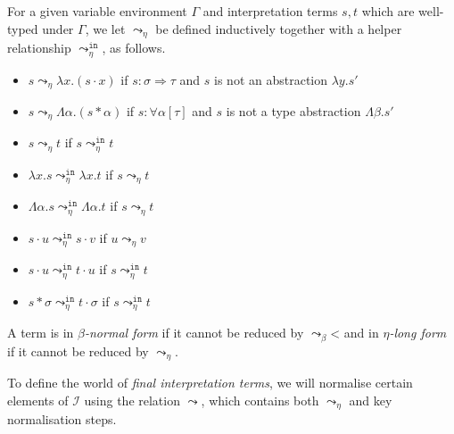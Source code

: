 \documentclass[runningheads,a4paper]{llncs}
\newcommand{\Iterms}{\mathcal{I}}
\newcommand{\quant}[2]{\forall #1[#2]}
\newcommand{\arrtype}{\Rightarrow}
\newcommand{\arreta}{\leadsto_\eta}
\newcommand{\arrbeta}{\leadsto_\beta}
\newcommand{\arretain}{\leadsto_\eta^{\mathtt{in}}}
\newcommand{\arrnormalise}{\leadsto}
\newcommand{\abs}[2]{\lambda #1.#2}
\newcommand{\tabs}[2]{\Lambda #1.#2}
\newcommand{\app}[2]{#1 \cdot #2}
\newcommand{\tapp}[2]{#1 * #2}
\begin{document}
\begin{definition}
For a given variable environment $\Gamma$ and interpretation terms $s,
t$ which are well-typed under $\Gamma$, we let $\arreta$ be defined
inductively together with a helper relationship $\arretain$, as follows.
\begin{itemize}
\item $s \arreta \abs{x}{(\app{s}{x})}$ if $s : \sigma \arrtype \tau$
  and $s$ is not an abstraction $\abs{y}{s'}$
\item $s \arreta \tabs{\alpha}{(\tapp{s}{\alpha})}$ if $s : \quant{
  \alpha}{\tau}$ and $s$ is not a type abstraction $\tabs{\beta}{s'}$
\item $s \arreta t$ if $s \arretain t$
\item $\abs{x}{s} \arretain \abs{x}{t}$ if $s \arreta t$
\item $\tabs{\alpha}{s} \arretain \tabs{\alpha}{t}$ if $s \arreta t$
\item $\app{s}{u} \arretain \app{s}{v}$ if $u \arreta v$
\item $\app{s}{u} \arretain \app{t}{u}$ if $s \arretain t$
\item $\tapp{s}{\sigma} \arretain \app{t}{\sigma}$ if $s \arretain t$
\end{itemize}
A term is in \emph{$\beta$-normal form} if it cannot be reduced by
$\arrbeta$< and in \emph{$\eta$-long form} if it cannot be reduced by
$\arreta$.
\end{definition}

To define the world of \emph{final interpretation terms}, we will
normalise certain elements of $\Iterms$ using the relation
$\arrnormalise$, which contains both $\arreta$ and key normalisation
steps.
\end{document}
